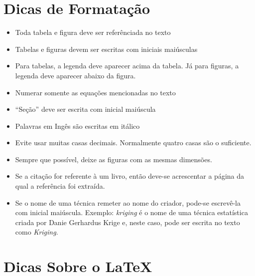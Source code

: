 \documentclass{article}
\begin{document}
\pagebreak

\section{Dicas de Formatação} \label{sec:dicas_formatacao}

\begin{itemize}
  \item Toda tabela e figura deve ser referênciada no texto
  \item Tabelas e figuras devem ser escritas com iniciais maiúsculas
  \item Para tabelas, a legenda deve aparecer acima da tabela. Já para figuras, a legenda deve aparecer abaixo da figura.
  \item Numerar somente as equações mencionadas no texto
  \item ``Seção'' deve ser escrita com inicial maiúscula
  \item Palavras em Ingês são escritas em itálico
  \item Evite usar muitas casas decimais. Normalmente quatro casas são o suficiente.
  \item Sempre que possível, deixe as figuras com as mesmas dimensões.
  \item Se a citação for referente à um livro, então deve-se acrescentar a página da qual a referência foi extraída.
  \item Se o nome de uma técnica remeter ao nome do criador, pode-se escrevê-la com inicial maiúscula. 
    \subitem Exemplo: \textit{kriging} é o nome de uma técnica estatística criada por Danie Gerhardus Krige e, neste caso, pode ser escrita no texto como \textit{Kriging}.
\end{itemize}

\pagebreak

\section{Dicas Sobre o \LaTeX} \label{sec:latex}
\end{document}
